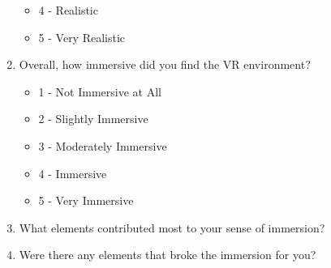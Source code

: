 \begin{enumerate}
\begin{itemize}
        \item 4 - Realistic
        \item 5 - Very Realistic
    \end{itemize}
    \item Overall, how immersive did you find the VR environment?
    \begin{itemize}
        \item 1 - Not Immersive at All
        \item 2 - Slightly Immersive
        \item 3 - Moderately Immersive
        \item 4 - Immersive
        \item 5 - Very Immersive
    \end{itemize}
    \item What elements contributed most to your sense of immersion?
    \item Were there any elements that broke the immersion for you?
\end{enumerate}

